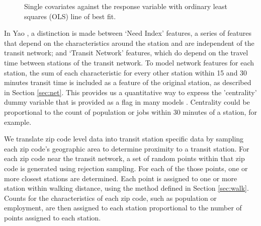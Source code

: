 \documentclass[11pt]{report}
\begin{document}
\begin{figure}[H]
\centering
{}
\caption{Single covariates against the response variable with ordinary least squares (OLS) line of best fit.}\label{fig:chartypes}
\end{figure}


In Yao \cite{Yao2007}, a distinction is made between `Need Index' features, a series of features that depend on the characteristics around the station and are independent of the transit network; and `Transit Network' features, which do depend on the travel time between stations of the transit network. To model network features for each station, the sum of each characteristic for every other station within 15 and 30 minutes transit time is included as a feature of the original station, as described in Section \ref{sec:net}. This provides us a quantitative way to express the 'centrality' dummy variable that is provided as a flag in many models \cite{Kuby2004, Durning2015}. Centrality could be proportional to the count of population or jobs within 30 minutes of a station, for example. 

We translate zip code level data into transit station specific data by sampling each zip code's geographic area to determine proximity to a transit station. For each zip code near the transit network, a set of random points within that zip code is generated using rejection sampling. For each of the those points, one or more closest stations are determined. Each point is assigned to one or more station within walking distance, using the method defined in Section \ref{sec:walk}. Counts for the characteristics of each zip code, such as population or employment, are then assigned to each station proportional to the number of points assigned to each station.
\end{document}
